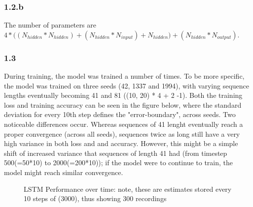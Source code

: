 \subsubsection*{1.2.b}
The number of parameters are $4 * \Big((N_{hidden} * N_{hidden}) + (N_{hidden} * N_{input}) 
+ N_{hidden}\Big) + (N_{hidden} * N_{output}) $.

\subsubsection*{1.3}
During training, the model was trained a number of times. To be more specific, the model was trained on three seeds (42, 1337 and 1994), with varying
sequence lengths eventually becoming 41 and 81 ((10, 20) * 4 + 2 -1). Both the training loss and training accuracy can be seen in the figure below, where
the standard deviation for every 10th step defines the "error-boundary", across seeds. Two noticeable differences occur. Whereas
sequences of 41 lenght eventually reach a proper convergence (across all seeds), sequences twice as long
still have a very high variance in both loss and and accuracy. However, this might be a simple shift of increased
variance that sequences of length 41 had (from timestep 500(=50*10) to 2000(=200*10)); if the model were to continue
to train, the model might reach similar convergence.

\begin{figure}[h]%
    \centering
    \qquad
    \caption{LSTM Performance over time: note, these are estimates stored every 10 steps of (3000), thus showing 300 recordings}%
    \label{fig:defaults}%
\end{figure}


